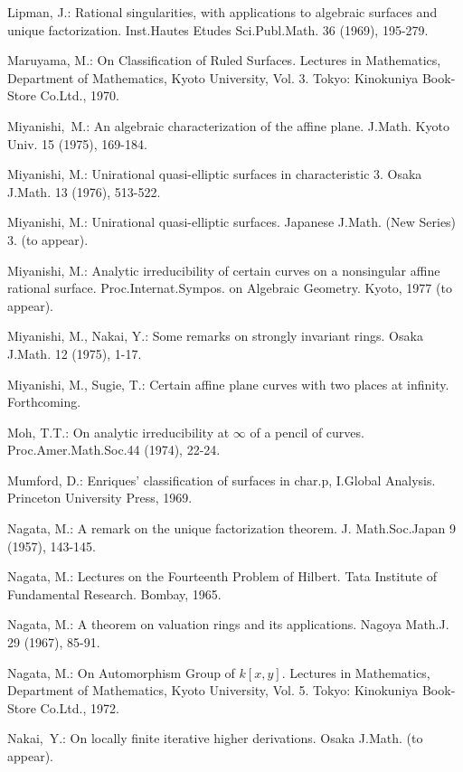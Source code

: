 \begin{thebibliography}{99}
 Lipman, J.: Rational singularities, with applications to
  algebraic surfaces and unique factorization. Inst.\@ Hautes Etudes
  Sci.\@ Publ.\@ Math. 36 (1969), 195-279.

 Maruyama, M.: On Classification of Ruled Surfaces. Lectures in
  Mathematics, Department of Mathematics, Kyoto University, Vol.\@
  3. Tokyo: Kinokuniya Book-Store Co.\@ Ltd., 1970.

 Miyanishi,\pageoriginale\ M.: An algebraic characterization of the affine
  plane. J.\@ Math. Kyoto Univ. 15 (1975), 169-184.

 Miyanishi, M.: Unirational quasi-elliptic surfaces in
  characteristic 3. Osaka J.\@ Math. 13 (1976), 513-522.

 Miyanishi, M.: Unirational quasi-elliptic surfaces. Japanese
  J.\@ Math. (New Series) 3. (to appear).

 Miyanishi, M.: Analytic irreducibility of certain curves on a
  nonsingular affine rational surface. Proc.\@ Internat.\@ Sympos.\@
  on Algebraic Geometry. Kyoto, 1977 (to appear).

 Miyanishi, M., Nakai, Y.: Some remarks on strongly invariant
  rings. Osaka J.\@ Math. 12 (1975), 1-17.

 Miyanishi, M., Sugie, T.: Certain affine plane curves with two
  places at infinity. Forthcoming.

 Moh, T.T.: On analytic irreducibility at $\infty$ of a pencil of
  curves. Proc.\@ Amer.\@ Math.\@ Soc.\@ 44 (1974), 22-24.

 Mumford, D.: Enriques' classification of surfaces in char.\@ p,
  I.\@ Global Analysis. Princeton University Press, 1969.

 Nagata, M.: A remark on the unique factorization theorem. J.\@
  Math.\@ Soc.\@ Japan 9 (1957), 143-145.

 Nagata, M.: Lectures on the Fourteenth Problem of Hilbert. Tata
  Institute of Fundamental Research. Bombay, 1965.

 Nagata, M.: A theorem on valuation rings and its
  applications. Nagoya Math.\@ J. 29 (1967), 85-91.

 Nagata, M.: On Automorphism Group of $k[x,y]$. Lectures in
  Mathematics, Department of Mathematics, Kyoto University, Vol.\@
  5. Tokyo: Kinokuniya Book-Store Co.\@ Ltd., 1972.

 Nakai,\pageoriginale\ Y.: On locally finite iterative higher
  derivations. Osaka J.\@ Math. (to appear).


\end{thebibliography}
